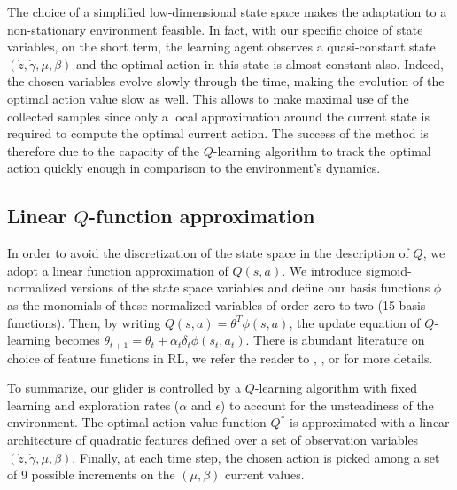 \documentclass[a4paper, 10pt, conference]{ieeeconf}
\begin{document}
The choice of a simplified low-dimensional state space makes the adaptation to a non-stationary environment feasible. In fact, with our specific choice of state variables, on the short term, the learning agent observes a quasi-constant state $(\dot{z},\dot{\gamma}, \mu,\beta)$ and the optimal action in this state is almost constant also. Indeed, the chosen variables evolve slowly through the time, making the evolution of the optimal action value slow as well. This allows to make maximal use	of the collected samples since only a local approximation around the current state is required to compute the optimal current action. The success of the method is therefore due to the capacity of the $Q$-learning algorithm to track the optimal action quickly enough in comparison to the environment's dynamics.

\subsection{Linear $Q$-function approximation}

In order to avoid the discretization of the state space in the description of $Q$, we adopt a linear function approximation of $Q(s,a)$. We introduce sigmoid-normalized versions of the state space variables and define our basis functions $\phi$ as the monomials of these normalized variables of order zero to two (15 basis functions). Then, by writing $Q(s,a)=\theta^T \phi(s,a)$, the update equation of $Q$-learning becomes $\theta_{t+1}=\theta_t + \alpha_t\delta_t\phi(s_t,a_t)$. 
There is abundant literature on choice of feature functions in RL, we refer the reader to \cite{parr08}, \cite{hachiya10}, or \cite{nguyen13} for more details.


To summarize, our glider is controlled by a $Q$-learning algorithm with fixed learning and exploration rates ($\alpha$ and $\epsilon$) to account for the unsteadiness of the environment. The optimal action-value function $Q^{*}$ is approximated with a linear architecture of quadratic features defined over a set of observation variables $\left(\dot{z}, \dot{\gamma}, \mu, \beta \right)$. Finally, at each time step, the chosen action is picked among a set of 9 possible increments on the $\left(\mu, \beta\right)$ current values.
\end{document}

